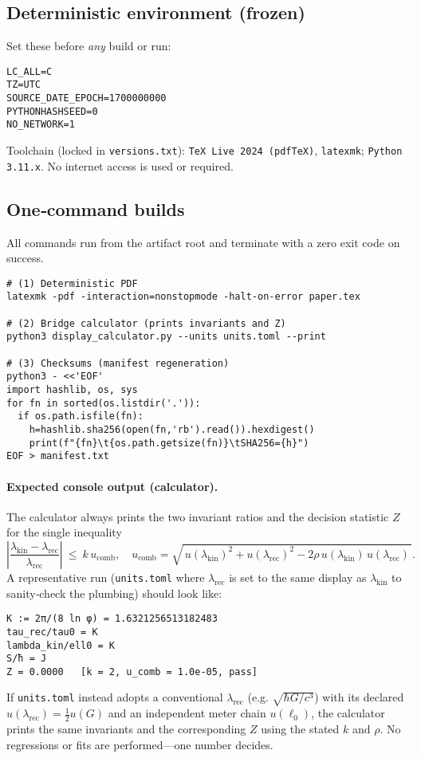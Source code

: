 \documentclass[11pt]{article}
\begin{document}
\subsection*{Deterministic environment (frozen)}
Set these before \emph{any} build or run:
\begin{verbatim}
LC_ALL=C
TZ=UTC
SOURCE_DATE_EPOCH=1700000000
PYTHONHASHSEED=0
NO_NETWORK=1
\end{verbatim}
Toolchain (locked in \texttt{versions.txt}): \texttt{TeX Live 2024 (pdfTeX)}, \texttt{latexmk}; \texttt{Python 3.11.x}. No internet access is used or required.

\subsection*{One‑command builds}
All commands run from the artifact root and terminate with a zero exit code on success.
\begin{verbatim}
# (1) Deterministic PDF
latexmk -pdf -interaction=nonstopmode -halt-on-error paper.tex

# (2) Bridge calculator (prints invariants and Z)
python3 display_calculator.py --units units.toml --print

# (3) Checksums (manifest regeneration)
python3 - <<'EOF'
import hashlib, os, sys
for fn in sorted(os.listdir('.')):
  if os.path.isfile(fn):
    h=hashlib.sha256(open(fn,'rb').read()).hexdigest()
    print(f"{fn}\t{os.path.getsize(fn)}\tSHA256={h}")
EOF > manifest.txt
\end{verbatim}

\paragraph{Expected console output (calculator).}
The calculator always prints the two invariant ratios and the decision statistic \(Z\) for the single inequality
\[
\left|\frac{\lambda_{\mathrm{kin}}-\lambda_{\mathrm{rec}}}{\lambda_{\mathrm{rec}}}\right|\ \le\ k\,u_{\mathrm{comb}},\quad
u_{\mathrm{comb}}=\sqrt{\,u(\lambda_{\mathrm{kin}})^{2}+u(\lambda_{\mathrm{rec}})^{2}-2\rho\,u(\lambda_{\mathrm{kin}})\,u(\lambda_{\mathrm{rec}})\,}.
\]
A representative run (\texttt{units.toml} where \(\lambda_{\mathrm{rec}}\) is set to the same display as \(\lambda_{\mathrm{kin}}\) to sanity‑check the plumbing) should look like:
\begin{verbatim}
K := 2π/(8 ln φ) = 1.6321256513182483
tau_rec/tau0 = K
lambda_kin/ell0 = K
S/ħ = J
Z = 0.0000   [k = 2, u_comb = 1.0e-05, pass]
\end{verbatim}
If \texttt{units.toml} instead adopts a conventional \(\lambda_{\mathrm{rec}}\) (e.g. \(\sqrt{\hbar G/c^{3}}\)) with its declared \(u(\lambda_{\mathrm{rec}})=\tfrac12 u(G)\) and an independent meter chain \(u(\ell_{0})\), the calculator prints the same invariants and the corresponding \(Z\) using the stated \(k\) and \(\rho\). No regressions or fits are performed—one number decides.
\end{document}

